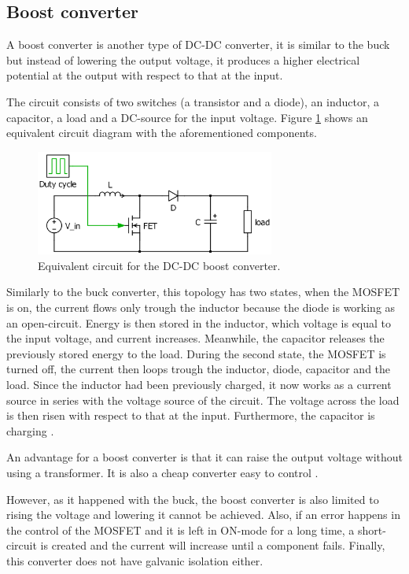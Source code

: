 \subsection{Boost converter\label{Boost-C}}

A boost converter is another type of DC-DC converter, it is similar to the buck but instead of lowering the output voltage, it produces a higher electrical potential at the output with respect to that at the input.

The circuit consists of two switches (a transistor and a diode), an inductor, a capacitor, a load and a DC-source for the input voltage. Figure \ref{Boost-converter} shows an equivalent circuit diagram with the aforementioned components. %

\begin{figure}[htbp]
	\begin{center}
		\includegraphics[width=0.7\textwidth]{../Pictures/Boost-converter}
		\caption{Equivalent circuit for the DC-DC boost converter.}
		\label{Boost-converter}
	\end{center}	
\end{figure}

Similarly to the buck converter, this topology has two states, when the MOSFET is on, the current flows only trough the inductor because the diode  is working as an open-circuit. Energy is then stored in the inductor, which voltage is equal to the input voltage, and current increases. Meanwhile, the capacitor releases the previously stored energy to the load.
During the second state, the MOSFET is turned off, the current then loops trough the inductor, diode, capacitor and the load. Since the inductor had been previously charged, it now works as a current source in series with the voltage source of the circuit. The voltage across the load is then risen with respect to that at the input. Furthermore, the capacitor is charging \cite{schematicbuckandboost}.

An advantage for a boost converter is that it can raise the output voltage without using a transformer. It is also a cheap converter easy to control \cite{advantageboost}. 

However, as it happened with the buck, the boost converter is also limited to rising the voltage and lowering it cannot be achieved. Also, if an error happens in the control of the MOSFET and it is left in ON-mode for a long time, a short-circuit is created and the current will increase until a component fails. Finally, this converter does not have galvanic isolation either. 
 
